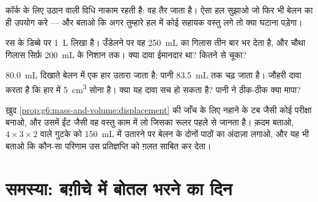 \begin{exercise}[$\star\star$]\label{exo:g6:mass-and-volume:9}
कॉर्क के लिए उठान वाली विधि नाकाम रहती है: वह तैर जाता है। ऐसा हल
सुझाओ जो फिर भी बेलन का ही उपयोग करे --- और बताओ कि अगर तुम्हारे हल
में कोई सहायक वस्तु लगे तो क्या घटाना पड़ेगा।
\end{exercise}

\begin{exercise}[$\star\star$]\label{exo:g6:mass-and-volume:10}
रस के डिब्बे पर \qty{1}{L} लिखा है। उँडेलने पर वह \qty{250}{mL} का
गिलास तीन बार भर देता है, और चौथा गिलास सिर्फ़ \qty{200}{mL} के
निशान तक। क्या दावा ईमानदार था? कितने से चूका?
\end{exercise}

\begin{exercise}[$\star\star$]\label{exo:g6:mass-and-volume:11}
\qty{80.0}{mL} दिखाते बेलन में एक हार उतारा जाता है; पानी
\qty{83.5}{mL} तक चढ़ जाता है। जौहरी दावा करता है कि हार में
\qty{5}{cm^3} सोना है। क्या यह दावा सच हो सकता है? पानी ने ठीक-ठीक
क्या मापा?
\end{exercise}

\begin{exercise}[$\star\star\star$]\label{exo:g6:mass-and-volume:12}
ख़ुद \cref{prop:g6:mass-and-volume:displacement} की जाँच के लिए
नहाने के टब जैसी कोई परीक्षा बनाओ, और उसमें ईंट जैसी वह वस्तु काम में
लो जिसका  रूलर पहले से जानता है। क़दम बताओ, $4 \times 3 \times 2$
 वाले गुटके को \qty{150}{mL} में उतारने पर बेलन के दोनों
पाठों का अंदाज़ा लगाओ, और यह भी बताओ कि कौन-सा परिणाम उस प्रतिज्ञप्ति
को ग़लत साबित कर देता।
\end{exercise}

\section{समस्या: बग़ीचे में बोतल भरने का दिन}

